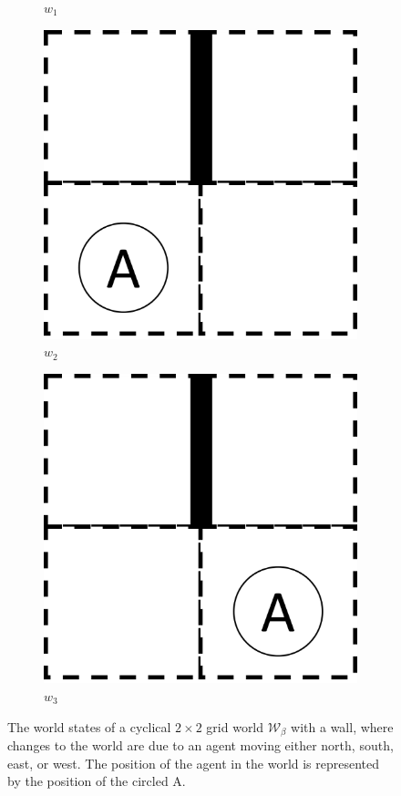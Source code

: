 \begin{figure}[H]
\begin{subfigure}[b]{0.45\linewidth}
        \caption{$w_{1}$}
        \vspace{0.25cm}
    \end{subfigure}
    \begin{subfigure}[b]{0.45\linewidth}
        \centering
        \includegraphics[width=0.5\linewidth]{5BeyondSBDRLGlobalAlgebras/Images/2x2_with_wall_world_states/w2.png}
        \caption{$w_{2}$}
    \end{subfigure}
    \begin{subfigure}[b]{0.45\linewidth}
        \centering
        \includegraphics[width=0.5\linewidth]{5BeyondSBDRLGlobalAlgebras/Images/2x2_with_wall_world_states/w3.png}
        \caption{$w_{3}$}
    \end{subfigure}
  \caption{
  The world states of a cyclical $2\times 2$ grid world $\mathscr{W}_{\beta}$ with a wall, where changes to the world are due to an agent moving either north, south, east, or west.
  The position of the agent in the world is represented by the position of the circled A.
  }
\label{fig:2x2_cyclical_grid_world_wall_states}
\end{figure}

